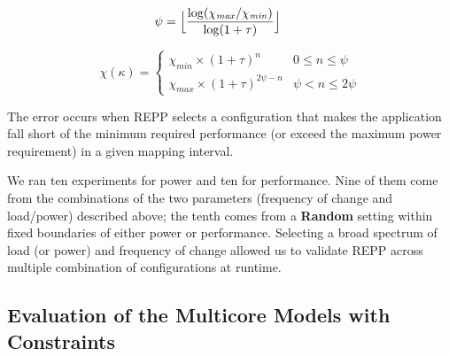 \vspace{0.2cm}

\begin{equation}
    \label{eq: topofcurve}
    \psi = \Bigl\lfloor\dfrac{\log(\chi_{\mathit{max}}/\chi_{\mathit{min}})}{\log(1+\tau)}\Bigr\rfloor\qquad                   
\end{equation}

\vspace{0.2cm}

\begin{equation}
    \label{eq: eachterm}
    \chi(\kappa) =
\left\{
    \begin{array}{ll}
        \chi_{\mathit{min}} \times (1+\tau)^{n}  & 0 \leq n \leq \psi\\
        \chi_{\mathit{max}} \times (1+\tau)^{2\psi-n}  & \psi < n \leq 2\psi
    \end{array}
\right.                    
\end{equation} 


\vspace{0.2cm}



The error occurs when REPP selects a configuration that makes the application fall short
of the minimum required performance (or exceed the maximum power requirement) in a given
mapping interval.

We ran ten experiments for power and ten for performance.  Nine of them come from the
combinations of the two parameters (frequency of change and load/power) described above;
the tenth comes from a \textbf{Random} setting within fixed boundaries of either power or
performance. Selecting a broad spectrum of load (or power) and frequency of change allowed
us to validate REPP across multiple combination of configurations at runtime. 

\subsection*{Evaluation of the Multicore Models with Constraints}
\label{subsubsec: eval repph}

